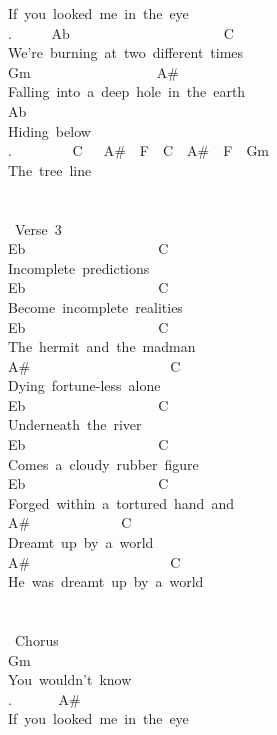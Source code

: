 {If\ you\ looked\ me\ in\ the\ eye\\
. \ \ \ \ \ Ab\ \ \ \ \ \ \ \ \ \ \ \ \ \ \ \ \ \ \ \ \ \ C\\
We're\ burning\ at\ two\ different\ times\\
Gm\ \ \ \ \ \ \ \ \ \ \ \ \ \ \ \ \ \ A\#\\
Falling\ into\ a\ deep\ hole\ in\ the\ earth\\
Ab\\
Hiding\ below\\
. \ \ \ \ \ \ \ \ C\ \ \ A\#\ \ F\ \ C\ \ A\#\ \ F\ \ Gm\\
The\ tree\ line\\
\\
\\
\lbrack\ Verse\ 3\rbrack\\
Eb\ \ \ \ \ \ \ \ \ \ \ \ \ \ \ \ \ \ \ C\\
Incomplete\ predictions\\
Eb\ \ \ \ \ \ \ \ \ \ \ \ \ \ \ \ \ \ \ C\\
Become\ incomplete\ realities\\
Eb\ \ \ \ \ \ \ \ \ \ \ \ \ \ \ \ \ \ \ C\\
The\ hermit\ and\ the\ madman\\
A\#\ \ \ \ \ \ \ \ \ \ \ \ \ \ \ \ \ \ \ \ C\\
Dying\ fortune-less\ alone\\
Eb\ \ \ \ \ \ \ \ \ \ \ \ \ \ \ \ \ \ \ C\\
Underneath\ the\ river\\
Eb\ \ \ \ \ \ \ \ \ \ \ \ \ \ \ \ \ \ \ C\\
Comes\ a\ cloudy\ rubber\ figure\\
Eb\ \ \ \ \ \ \ \ \ \ \ \ \ \ \ \ \ \ \ C\\
Forged\ within\ a\ tortured\ hand\ and\\
A\#\ \ \ \ \ \ \ \ \ \ \ \ \ C\\
Dreamt\ up\ by\ a\ world\\
A\#\ \ \ \ \ \ \ \ \ \ \ \ \ \ \ \ \ \ \ \ C\\
He\ was\ dreamt\ up\ by\ a\ world\\
\\
\\
\lbrack\ Chorus\rbrack\\
Gm\\
You\ wouldn't\ know\\
. \ \ \ \ \ \ A\#\\
If\ you\ looked\ me\ in\ the\ eye\\
}
